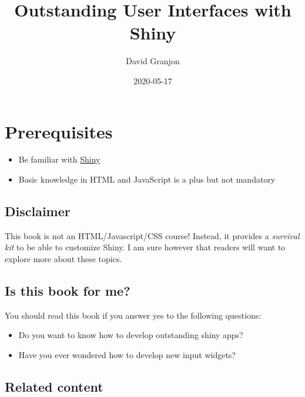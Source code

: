 \documentclass[]{book}
\title{Outstanding User Interfaces with Shiny}
\author{David Granjon}
\date{2020-05-17}
\providecommand{\tightlist}{%
  \setlength{\itemsep}{0pt}\setlength{\parskip}{0pt}}
\begin{document}
\maketitle

{
\setcounter{tocdepth}{1}
\tableofcontents
}
\hypertarget{prerequisites}{%
\chapter*{Prerequisites}\label{prerequisites}}

\begin{itemize}
\tightlist
\item
  Be familiar with \href{https://mastering-shiny.org}{Shiny}
\item
  Basic knowledge in HTML and JavaScript is a plus but not mandatory
\end{itemize}

\hypertarget{disclaimer}{%
\section*{Disclaimer}\label{disclaimer}}

This book is not an HTML/Javascript/CSS course! Instead, it provides a \emph{survival kit} to be able to customize Shiny. I am sure however that readers will want to explore more about these topics.

\hypertarget{is-this-book-for-me}{%
\section*{Is this book for me?}\label{is-this-book-for-me}}

You should read this book if you answer yes to the following questions:

\begin{itemize}
\tightlist
\item
  Do you want to know how to develop outstanding shiny apps?
\item
  Have you ever wondered how to develop new input widgets?
\end{itemize}

\hypertarget{related-content}{%
\section*{Related content}\label{related-content}}
\end{document}
